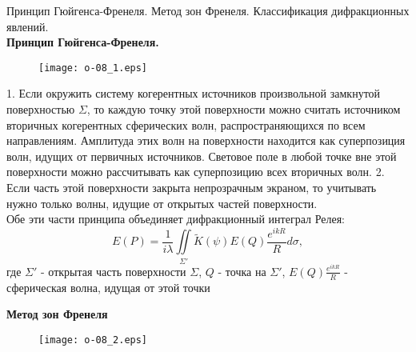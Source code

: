 \documentclass[__main__.tex]{subfiles}
\begin{document}
Принцип Гюйгенса-Френеля. Метод зон Френеля. Классификация дифракционных явлений.\\ 

\textbf{Принцип Гюйгенса-Френеля. }\\

\begin{figure}[h]
	\begin{center}
		\texttt{[image: o-08\_1.eps]}
	\end{center}
\end{figure}

1. Если окружить систему когерентных источников произвольной замкнутой поверхностью $\Sigma$, то каждую точку этой поверхности можно считать источником вторичных когерентных сферических волн, распространяющихся по всем направлениям. Амплитуда этих волн на поверхности находится как суперпозиция волн, идущих от первичных источников. Световое поле в любой точке вне этой поверхности можно рассчитывать как суперпозицию всех вторичных волн. 
2. Если часть этой поверхности закрыта непрозрачным экраном, то учитывать нужно только волны, идущие от открытых частей поверхности.\\

Обе эти части принципа объединяет дифракционный интеграл Релея:
$$E(P) = \frac{1}{i\lambda}\iint\limits_{\Sigma'} \widetilde K(\psi) E(Q)\frac{e^{ikR}}{R}d\sigma,$$
где $\Sigma'$ - открытая часть поверхности $\Sigma$, $Q$ - точка на $\Sigma'$, $E(Q)\frac{e^{ikR}}{R}$ - сферическая волна, идущая от этой точки 


\textbf{Метод зон Френеля}\\

\begin{figure}[h]
	\begin{center}
		\texttt{[image: o-08\_2.eps]}
	\end{center}
\end{figure}
\end{document}
